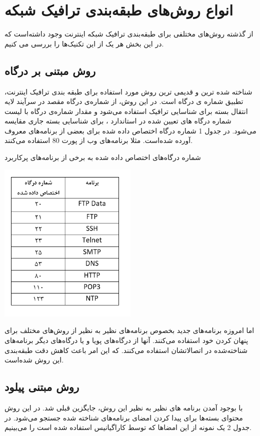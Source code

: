 \chapter{انواع روش‌های طبقه‌بندی ترافیک شبکه}

از گذشته روش‌های مختلفی برای طبقه‌بندی ترافیک شبکه اینترنت وجود داشته‌است که در این بخش هر یک از این تکنیک‌ها را بررسی می کنیم. 

\section{روش مبتنی بر درگاه }
شناخته شده ترین و قدیمی ترین روش مورد استفاده برای طبقه بندی ترافیک اینترنت، تطبیق شماره ی درگاه است. در این روش، از شماره‌ی درگاه مقصد در سرآیند لایه انتقال
بسته برای شناسایی ترافیک استفاده می‌شود و مقدار شماره‌ی درگاه با لیست شماره درگاه های تعیین شده در استاندارد ، برای شناسایی بسته جاری مقایسه می‌شود. در جدول 1 شماره درگاه اختصاص داده شده برای بعضی از برنامه‌های معروف آورده شده‌است. مثلا برنامه‌های وب از پورت 80 استفاده می‌کنند. \cite{iana}

\begin{table}[!h]
\caption{شماره درگاه‌های اختصاص داده شده به برخی از برنامه‌های پرکاربرد}
\centerline{\includegraphics[width=0.5\textwidth]{ports.PNG}}
\end{table}

اما امروزه برنامه‌های جدید بخصوص برنامه‌های نظیر به نظیر از روش‌های مختلف برای پنهان کردن خود استفاده می‌کنند. آنها از درگاه‌های پویا و یا درگاه‌های دیگر برنامه‌های
شناخته‌شده در اتصالاتشان استفاده می‌کنند. که این امر باعث کاهش دقت طبقه‌بندی این روش شده‌است.

\section{روش مبتنی پیلود  }
با بوجود آمدن برنامه های نظیر به نظیر این روش، جایگزین قبلی شد. در این روش محتوای بسته‌ها برای پیدا کردن امضای برنامه‌های شناخته شده جستجو می‌شود. در جدول 2 یک نمونه از این امضاها که توسط کاراگیانیس استفاده شده است را می‌بینیم.

